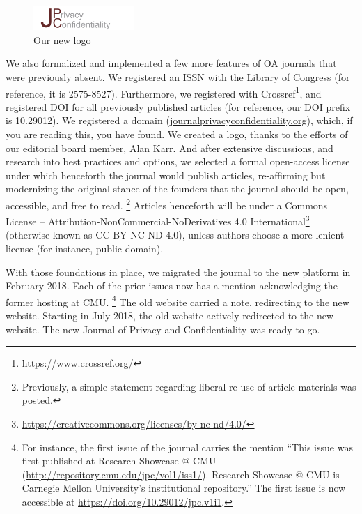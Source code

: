 \documentclass{jpcfinal} %
\newcommand{\urlcite}[2]{#2\footnote{\url{#1}}}
\begin{document}
\begin{figure}
	\begin{cornerbox}[width=2in]
		\includegraphics[width=1.5in]{tmpl-images/JPC_4.jpg}
		\caption{Our new logo}
		
	\end{cornerbox}
\end{figure}
We also formalized and implemented a few more features of OA journals that were previously absent. We registered an \ac{ISSN} with the Library of Congress (for reference, it is 2575-8527). Furthermore, we registered with \urlcite{https://www.crossref.org/}{Crossref}, and registered \ac{DOI} for all previously published articles (for reference, our \ac{DOI} prefix is 10.29012).  We registered a domain (\href{https://www.journalprivacyconfidentiality.org}{journalprivacyconfidentiality.org}), which, if you are reading this, you have found. We created a logo, thanks to the efforts of our editorial board member, Alan Karr. And after extensive discussions, and research into best practices and options, we selected a formal open-access license under which henceforth the journal would publish articles, re-affirming but modernizing the original stance of the founders that the journal should be open, accessible, and free to read.%
\footnote{Previously, a simple statement regarding liberal re-use of article materials was posted.}
Articles henceforth will be under a  \urlcite{https://creativecommons.org/licenses/by-nc-nd/4.0/}{Commons License – Attribution-NonCommercial-NoDerivatives 4.0 International} (otherwise known as CC BY-NC-ND 4.0), unless authors choose a more lenient license (for instance, public domain). 



With those foundations in place, we migrated the journal to the new platform in February 2018. 
Each of the prior issues now has a mention acknowledging the former hosting at CMU.%
\footnote{
	For instance, the first issue of the journal carries the mention ``This issue was first published at Research Showcase @ CMU (\url{http://repository.cmu.edu/jpc/vol1/iss1/}). Research Showcase @ CMU is Carnegie Mellon University's institutional repository.'' The first issue is now accessible at \url{https://doi.org/10.29012/jpc.v1i1}.}
The old website  carried a note, redirecting to the new website. Starting in July 2018, the old website actively redirected to the new website. The new Journal of Privacy and Confidentiality was ready to go.
\end{document}
